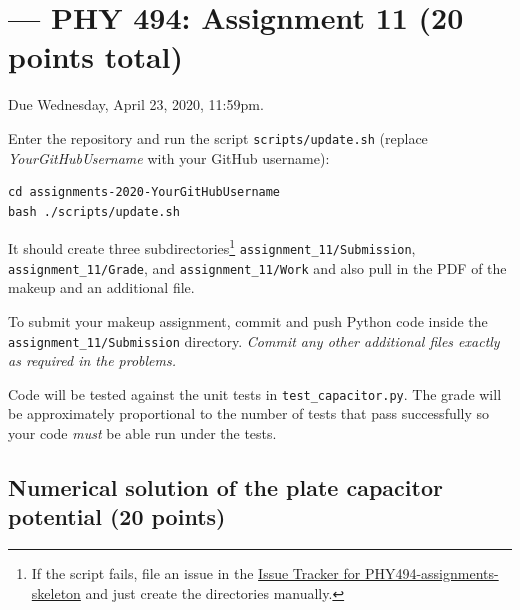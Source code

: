 \documentclass[letterpaper]{scrartcl}
\newcommand{\anumber}{11}
\newcommand{\anum}{\anumber}
\begin{document}

\setcounter{section}{\anumber}
\addtocounter{section}{-1}
\section{ --- PHY 494:  Assignment \anumber{} (20 points total)}

\noindent Due Wednesday, April 23, 2020, 11:59pm.

\noindent
{}

Enter the repository and run the script
\texttt{scripts/update.sh} (replace \emph{YourGitHubUsername} with
your GitHub username):
\begin{verbatim}
cd assignments-2020-YourGitHubUsername
bash ./scripts/update.sh 
\end{verbatim} 
It should create three subdirectories\footnote{If the script fails,
  file an issue in the
  \href{https://github.com/ASU-CompMethodsPhysics-PHY494/PHY494-assignments-skeleton/issues}{Issue
    Tracker for PHY494-assignments-skeleton} and just create the
  directories manually.} \texttt{assignment\_\anum{}/Submission},
\texttt{assignment\_\anum{}/Grade}, and
\texttt{assignment\_\anum{}/Work} and also pull in the PDF of the
makeup and an additional file.

To submit your makeup assignment, commit and push Python code inside
the \texttt{assignment\_\anum{}/Submission} directory. \emph{Commit
  any other additional files exactly as required in the problems.}

Code will be tested against the unit tests in
\texttt{test\_capacitor.py}. The grade will be approximately
proportional to the number of tests that pass successfully so your
code \emph{must} be able run under the tests.



\subsection{Numerical solution of the plate capacitor potential (20 points)}
\label{sec:capacitor}
\end{document}
